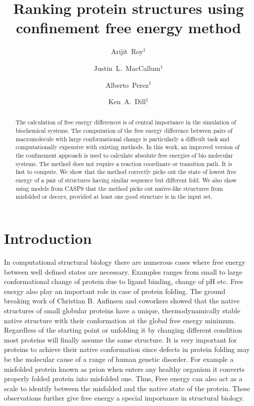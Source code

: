 \documentclass[12pt]{article}
\author{Arijit~Roy$^1$}
\author{Justin~L.~MacCallum$^1$}
\author{Alberto~Perez$^1$}
\author{Ken~A.~Dill$^1$}
\affil{$^1$Laufer Center for Physical and Quantitative Biology\\
    Stony Brook University\\
    Stony Brook, NY 11794-5252.}
\title{Ranking protein structures using confinement free energy method}
\begin{document}
\maketitle
\begin{abstract}

The calculation of free energy differences is of central importance in the simulation of biochemical systems.  The computation of the 
free energy difference between pairs of macromolecule with large conformational change is particularly a difficult task and computationally 
expensive with existing methods. In this work, an improved version of the confinement approach is used to calculate absolute free energies 
of bio molecular systems. The method does not require a reaction coordinate or 
transition path. It is fast to compute. We show that the method correctly picks out the state of lowest free energy of a pair of 
structures having similar sequence but different fold. We also show using models from CASP9 that the method picks out native-like 
structures from misfolded or decoys, provided at least one good structure is in the input set.


\end{abstract}

\section{Introduction}


In computational structural biology there are numerous cases where free energy between well defined states are necessary. Examples
ranges from small to large conformational change of protein due to ligand binding, change of pH etc. Free energy also play an important 
role in case of protein folding. The ground breaking
work of Christian B. Anfinsen and coworkers showed that the native structures of small globular proteins have a unique, thermodynamically
stable native structure with their conformation at the global free energy minimum. Regardless of the starting point or unfolding it by
changing different condition most proteins will finally assume the same structure. It is very important for proteins to achieve 
their native conformation since defects in protein folding may be the molecular cause of a range of human genetic disorder. For 
example a misfolded protein known as prion when enters any healthy organism it converts properly folded protein into misfolded one. 
Thus, Free energy can also act as a scale to identify between the misfolded and the native state of the protein. These 
observations further give free energy a special importance in structural biology.
\end{document}
